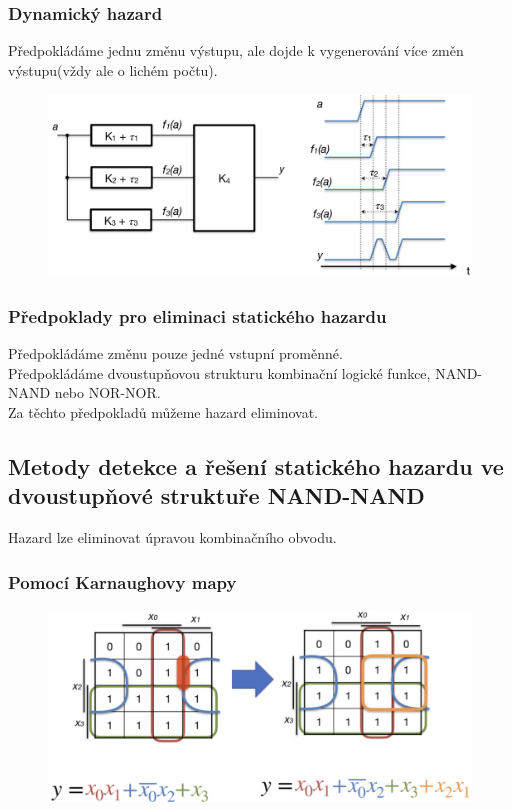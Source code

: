 \subsubsection{Dynamický hazard}
Předpokládáme jednu změnu výstupu, ale dojde k vygenerování více změn výstupu(vždy ale o lichém počtu).\\
\begin{figure}[h!]
    \centering
    \includegraphics*[scale = 0.3]{img/DynH.png}
\end{figure}

\subsubsection{Předpoklady pro eliminaci statického hazardu}
Předpokládáme změnu pouze jedné vstupní proměnné.\\
Předpokládáme dvoustupňovou strukturu kombinační logické funkce, NAND-NAND nebo NOR-NOR.\\
Za těchto předpokladů můžeme hazard eliminovat.\\
\subsection{Metody detekce a řešení statického hazardu ve dvoustupňové struktuře NAND-NAND}
Hazard lze eliminovat úpravou kombinačního obvodu.\\
\subsubsection{Pomocí Karnaughovy mapy}
\begin{figure}[h!]
    \centering
    \includegraphics[scale = 0.2]{img/ElimHazKM.png}
\end{figure}

